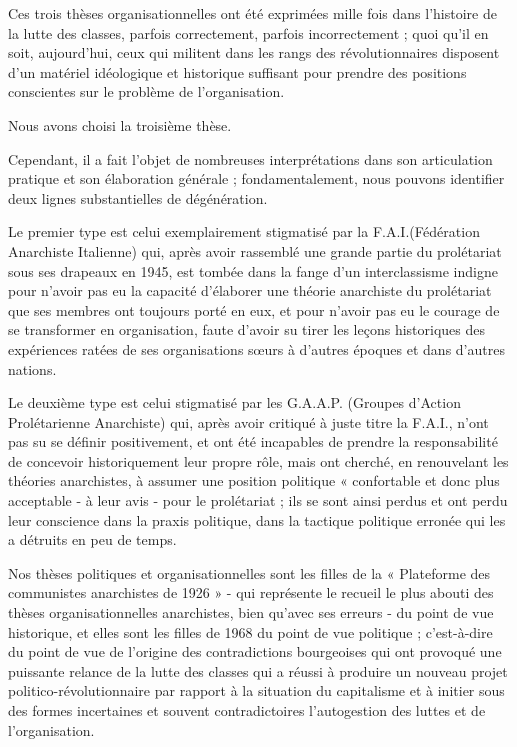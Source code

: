 Ces trois thèses organisationnelles ont été exprimées mille fois dans l'histoire de la lutte des classes, parfois correctement, parfois incorrectement ; quoi qu'il en soit, aujourd'hui, ceux qui militent dans les rangs des révolutionnaires disposent d'un matériel idéologique et historique suffisant pour prendre des positions conscientes sur le problème de l'organisation.

Nous avons choisi la troisième thèse.

Cependant, il a fait l'objet de nombreuses interprétations dans son articulation pratique et son élaboration générale ; fondamentalement, nous pouvons identifier deux lignes substantielles de dégénération.

Le premier type est celui exemplairement stigmatisé par la F.A.I.(Fédération Anarchiste Italienne) qui, après avoir rassemblé une grande partie du prolétariat sous ses drapeaux en 1945, est tombée dans la fange d'un interclassisme indigne pour n'avoir pas eu la capacité d'élaborer une théorie anarchiste du prolétariat que ses membres ont toujours porté en eux, et pour n'avoir pas eu le courage de se transformer en organisation, faute d'avoir su tirer les leçons historiques des expériences ratées de ses organisations sœurs à d'autres époques et dans d'autres nations.

Le deuxième type est celui stigmatisé par les G.A.A.P. (Groupes d'Action Prolétarienne Anarchiste) qui, après avoir critiqué à juste titre la F.A.I., n'ont pas su se définir positivement, et ont été incapables de prendre la responsabilité de concevoir historiquement leur propre rôle, mais ont cherché, en renouvelant les théories anarchistes, à assumer une position politique « confortable et donc plus acceptable - à leur avis - pour le prolétariat ; ils se sont ainsi perdus et ont perdu leur conscience dans la praxis politique, dans la tactique politique erronée qui les a détruits en peu de temps.

Nos thèses politiques et organisationnelles sont les filles de la « Plateforme des communistes anarchistes de 1926 » - qui représente le recueil le plus abouti des thèses organisationnelles anarchistes, bien qu'avec ses erreurs - du point de vue historique, et elles sont les filles de 1968 du point de vue politique ; c'est-à-dire du point de vue de l'origine des contradictions bourgeoises qui ont provoqué une puissante relance de la lutte des classes qui a réussi à produire un nouveau projet politico-révolutionnaire par rapport à la situation du capitalisme et à initier sous des formes incertaines et souvent contradictoires l'autogestion des luttes et de l'organisation.

